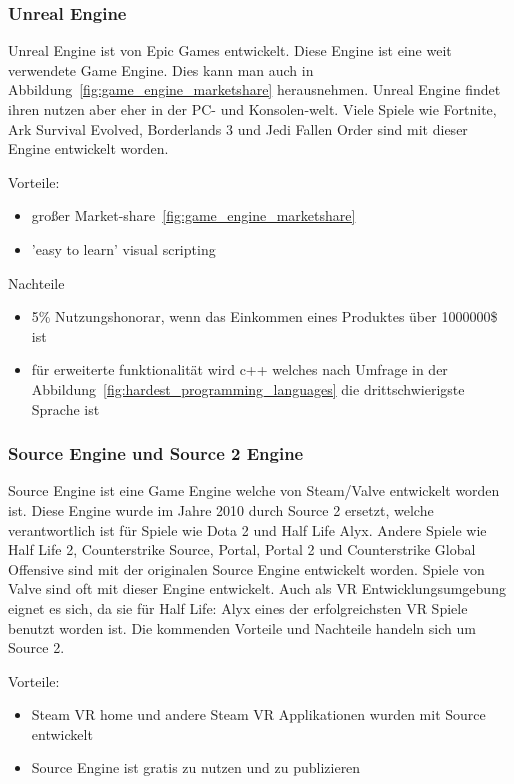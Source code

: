 \subsubsection{Unreal Engine}
\label{sec:unreal_engine}

Unreal Engine ist von Epic Games entwickelt.
Diese Engine ist eine weit verwendete Game Engine.
Dies kann man auch in Abbildung~\ref{fig:game_engine_marketshare} herausnehmen.
Unreal Engine findet ihren nutzen aber eher in der PC- und Konsolen-welt.
Viele Spiele wie Fortnite, Ark Survival Evolved, Borderlands 3 und Jedi Fallen Order sind mit dieser Engine entwickelt worden.

Vorteile:

\begin{itemize}
    \item großer Market-share~\ref{fig:game_engine_marketshare}
    \item 'easy to learn' visual scripting
\end{itemize}

Nachteile

\begin{itemize}
    \item 5\% Nutzungshonorar, wenn das Einkommen eines Produktes über 1000000\$ ist
    \item für erweiterte funktionalität wird c++ welches nach Umfrage in der Abbildung~\ref{fig:hardest_programming_languages} die drittschwierigste Sprache ist
\end{itemize}

\subsubsection{Source Engine und Source 2 Engine}

Source Engine ist eine Game Engine welche von Steam/Valve entwickelt worden ist.
Diese Engine wurde im Jahre 2010 durch Source 2 ersetzt, welche verantwortlich ist für Spiele wie Dota 2 und Half Life Alyx.
Andere Spiele wie Half Life 2, Counterstrike Source, Portal, Portal 2 und Counterstrike Global Offensive sind mit der originalen Source Engine entwickelt worden.
Spiele von Valve sind oft mit dieser Engine entwickelt.
Auch als VR Entwicklungsumgebung eignet es sich, da sie für Half Life: Alyx eines der erfolgreichsten VR Spiele benutzt worden ist.
Die kommenden Vorteile und Nachteile handeln sich um Source 2.

Vorteile:

\begin{itemize}
    \item Steam VR home und andere Steam VR Applikationen wurden mit Source entwickelt
    \item Source Engine ist gratis zu nutzen und zu publizieren
\end{itemize}


